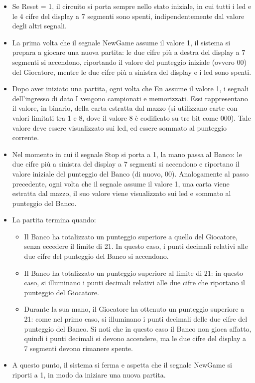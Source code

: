 \documentclass [11pt,a4paper,oneside,draft]{article}
\begin{document}
\begin{itemize}
\item Se Reset = 1, il circuito si porta sempre nello stato iniziale, in cui tutti i led e le
      4 cifre del display a 7 segmenti sono spenti, indipendentemente dal valore
      degli altri segnali.

\item La prima volta che il segnale NewGame assume il valore 1, il sistema si
      prepara a giocare una nuova partita: le due cifre più a destra del display a 7
      segmenti si accendono, riportando il valore del punteggio iniziale (ovvero 00)
      del Giocatore, mentre le due cifre più a sinistra del display e i led sono spenti.

\item Dopo aver iniziato una partita, ogni volta che En assume il valore 1, i segnali
      dell'ingresso di dato I vengono campionati e memorizzati. Essi rappresentano
      il valore, in binario, della carta estratta dal mazzo (si utilizzano carte con valori
      limitati tra 1 e 8, dove il valore 8 è codificato su tre bit come 000). Tale valore
      deve essere visualizzato sui led, ed essere sommato al punteggio corrente.

\item Nel momento in cui il segnale Stop si porta a 1, la mano passa al Banco: le
      due cifre più a sinistra del display a 7 segmenti si accendono e riportano il
      valore iniziale del punteggio del Banco (di nuovo, 00). Analogamente al passo
      precedente, ogni volta che il segnale assume il valore 1, una carta viene
      estratta dal mazzo, il suo valore viene visualizzato sui led e sommato al
      punteggio del Banco.

\item La partita termina quando:
      \begin{itemize}
      \item Il Banco ha totalizzato un punteggio superiore a quello del Giocatore,
            senza eccedere il limite di 21. In questo caso, i punti decimali relativi
            alle due cifre del punteggio del Banco si accendono.

      \item Il Banco ha totalizzato un punteggio superiore al limite di 21: in questo
            caso, si illuminano i punti decimali relativi alle due cifre che riportano il
            punteggio del Giocatore.

      \item Durante la sua mano, il Giocatore ha ottenuto un punteggio superiore a
            21: come nel primo caso, si illuminano i punti decimali delle due cifre
            del punteggio del Banco. Si noti che in questo caso il Banco non gioca
            affatto, quindi i punti decimali si devono accendere, ma le due cifre del
            display a 7 segmenti devono rimanere spente.
      \end{itemize}

\item A questo punto, il sistema si ferma e aspetta che il segnale NewGame si riporti
      a 1, in modo da iniziare una nuova partita.
\end{itemize}
\end{document}
